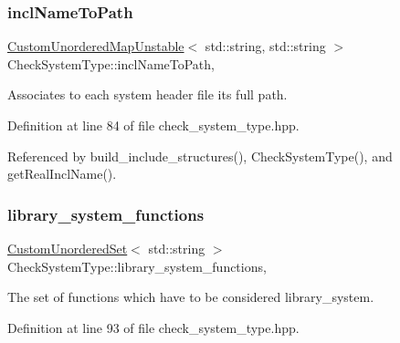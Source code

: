 \mbox{\label{classCheckSystemType_a8b0d505fbb50dce89783120fa9b77fba}} 
\subsubsection{\texorpdfstring{incl\+Name\+To\+Path}{inclNameToPath}}
{\footnotesize\ttfamily \hyperlink{custom__map_8hpp_a8cbaceffc09790a885ec7e9c17809c69}{Custom\+Unordered\+Map\+Unstable}$<$ std\+::string, std\+::string $>$ Check\+System\+Type\+::incl\+Name\+To\+Path\hspace{0.3cm}{\ttfamily [static]}, {\ttfamily [private]}}



Associates to each system header file its full path. 



Definition at line 84 of file check\+\_\+system\+\_\+type.\+hpp.



Referenced by build\+\_\+include\+\_\+structures(), Check\+System\+Type(), and get\+Real\+Incl\+Name().

\mbox{\label{classCheckSystemType_af0b680e809a1f861ed10cb3ba5b0926d}} 
\subsubsection{\texorpdfstring{library\+\_\+system\+\_\+functions}{library\_system\_functions}}
{\footnotesize\ttfamily \hyperlink{classCustomUnorderedSet}{Custom\+Unordered\+Set}$<$ std\+::string $>$ Check\+System\+Type\+::library\+\_\+system\+\_\+functions\hspace{0.3cm}{\ttfamily [static]}, {\ttfamily [private]}}



The set of functions which have to be considered library\+\_\+system. 



Definition at line 93 of file check\+\_\+system\+\_\+type.\+hpp.



